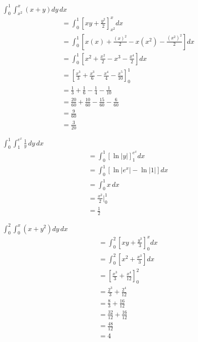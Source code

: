 \documentclass[12pt]{article}
\newenvironment{problem}[2][]{
    \begin{trivlist}
        \item[
            {\bfseries #1}
            {\bfseries #2.}
        ]
}{\end{trivlist}}
\begin{document}
\begin{problem}{9}
    $\displaystyle\int_0^1 \displaystyle\int_{x^2}^x \left(x + y\right) dy \, dx$
    \begin{align}
        &= \int_0^1 \left[xy + \frac{y^2}{2}\right]_{x^2}^x dx \\
        &= \int_0^1 \left[x\left(x\right) + \frac{\left(x\right)^2}{2} - x\left(x^2\right) - \frac{\left(x^2\right)^2}{2}\right] dx \\
        &= \int_0^1 \left[x^2 + \frac{x^2}{2} - x^3 - \frac{x^4}{2}\right] dx \\
        &= \left[\frac{x^3}{3} + \frac{x^3}{6} - \frac{x^4}{4} - \frac{x^5}{10}\right]_0^1 \\
        &= \frac{1}{3} + \frac{1}{6} - \frac{1}{4} - \frac{1}{10} \\
        &= \frac{20}{60} + \frac{10}{60} - \frac{15}{60} - \frac{6}{60} \\
        &= \frac{9}{60} \\
        &= \frac{3}{20}
    \end{align}
\end{problem}

\begin{problem}{11}
    $\displaystyle\int_0^1 \displaystyle\int_1^{e^x} \frac{1}{y} \, dy \, dx$
    \begin{align}
        &= \int_0^1 \left[\ln \left|y\right|\right]_1^{e^x} dx \\
        &= \int_0^1 \left[\ln \left|e^x\right| - \ln \left|1\right|\right] dx \\
        &= \int_0^1 x \, dx \\
        &= \frac{x^2}{2} \bigg|_0^1 \\
        &= \frac{1}{2}
    \end{align}
\end{problem}

\clearpage

\begin{problem}{13}
    $\displaystyle\int_0^2 \displaystyle\int_0^x \left(x + y^2\right) dy \, dx$
    \begin{align}
        &= \int_0^2 \left[xy + \frac{y^3}{3}\right]_0^x dx \\
        &= \int_0^2 \left[x^2 + \frac{x^3}{3}\right] dx \\
        &= \left[\frac{x^3}{3} + \frac{x^4}{12}\right]_0^2 \\
        &= \frac{2^3}{3} + \frac{2^4}{12} \\
        &= \frac{8}{3} + \frac{16}{12} \\
        &= \frac{32}{12} + \frac{16}{12} \\
        &= \frac{48}{12} \\
        &= 4
    \end{align}
\end{problem}
\end{document}
